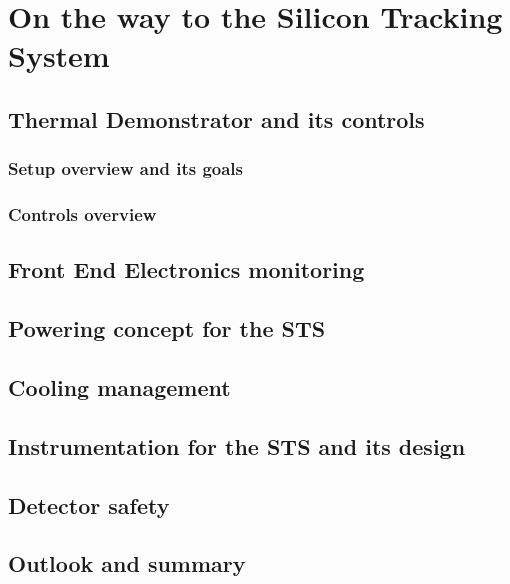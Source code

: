 \chapter{On the way to the Silicon Tracking System}
\section{Thermal Demonstrator and its controls}
\subsection{Setup overview and its goals}
\subsection{Controls overview}


\section{Front End Electronics monitoring}
\section{Powering concept for the STS}
\section{Cooling management}
\section{Instrumentation for the STS and its design}
\section{Detector safety}
\section{Outlook and summary}



%

\renewcommand\listfigurename{List of Figures}
\listoffigures
\renewcommand\listtablename{List of Tables}
\listoftables
\clearpage


\clearpage
\printbibliography
\clearpage
\printglossaries


